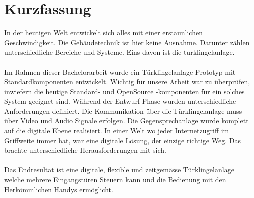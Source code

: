 \section*{Kurzfassung}
\label{sec:zusammenfassung}

In der heutigen Welt entwickelt sich alles mit einer erstaunlichen Geschwindigkeit. Die Gebäudetechnik ist hier keine Ausnahme. Darunter zählen unterschiedliche Bereiche und Systeme. Eins davon ist die \gls{turklingelanlage}.
\\
\\
Im Rahmen dieser Bachelorarbeit wurde ein Türklingelanlage-Prototyp mit Standardkomponenten entwickelt. Wichtig für unsere Arbeit war zu überprüfen, inwiefern die heutige Standard- und OpenSource -komponenten für ein solches System geeignet sind.
Während der Entwurf-Phase wurden unterschiedliche Anforderungen definiert. Die Kommunikation über die Türklingelanlage muss über Video und Audio Signale erfolgen. Die Gegensprechanlage wurde komplett auf die digitale Ebene realisiert. In einer Welt wo jeder Internetzugriff im Griffweite immer hat, war eine digitale Lösung, der einzige richtige Weg. Das brachte unterschiedliche Herausforderungen mit sich. 
\\
\\
Das Endresultat ist eine digitale, flexible und zeitgemässe Türklingelanlage welche mehrere Eingangstüren Steuern kann und die Bedienung mit den Herkömmlichen Handys ermöglicht. 